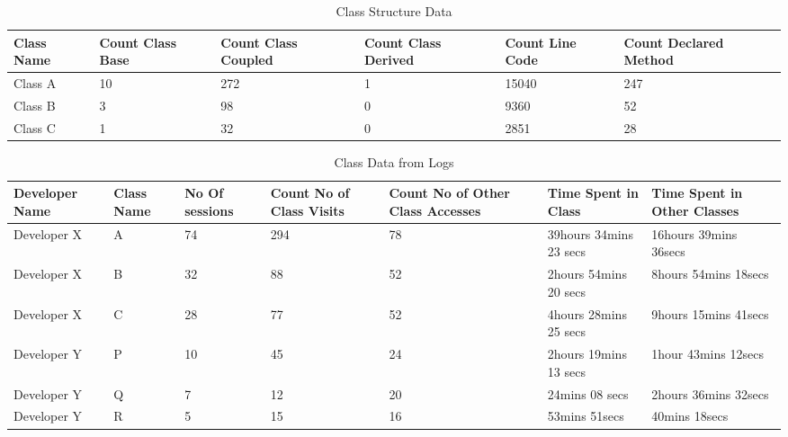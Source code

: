 \begin{center}
\begin{table*}[t]
	\centering
	\caption{Class Structure Data}
	\begin{tabular}{|l|l|l|l|l|l|}
	\hline

Class Name & Count Class Base & Count Class Coupled & Count Class Derived & Count Line Code & Count Declared Method\\
\hline\hline
Class A & 10 & 272 & 1 & 15040 & 247\\
\hline
Class B & 3 & 98 & 0 & 9360 & 52\\
\hline
Class C & 1 & 32 & 0 & 2851 & 28\\
\hline

	\end{tabular}
	\label{fig:ClassStructureAnalysisData}
\end{table*}
\end{center}

\begin{center}
\begin{table*}[t]
	\centering
	\caption{Class Data from Logs}
	\begin{tabular}{|l|l|l|l|l|l|l|}
	\hline

Developer Name & Class Name & No Of sessions &Count No of Class Visits & Count No of Other Class Accesses & Time Spent in Class & Time Spent in Other Classes\\
\hline\hline
Developer X & A & 74 & 294 & 78 & 39hours 34mins 23 secs & 16hours 39mins 36secs\\
\hline
Developer X & B & 32 & 88 & 52 & 2hours 54mins 20 secs & 8hours 54mins 18secs\\
\hline
Developer X & C & 28 & 77 & 52 & 4hours 28mins 25 secs & 9hours 15mins 41secs\\
\hline
Developer Y & P & 10 & 45 & 24 & 2hours 19mins 13 secs & 1hour 43mins 12secs\\
\hline
Developer Y & Q & 7 & 12 & 20 & 24mins 08 secs & 2hours 36mins 32secs\\
\hline
Developer Y & R & 5 & 15 & 16 & 53mins 51secs & 40mins 18secs\\
\hline

	\end{tabular}
	\label{fig:ClassAnalysisData}
\end{table*}
\end{center}

